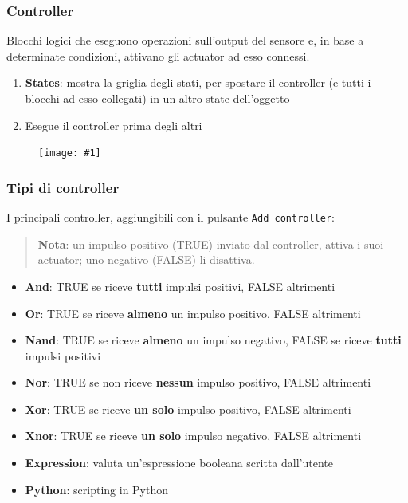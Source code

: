 \documentclass{beamer}
\def\code#1{\texttt{#1}}
\def\image[#1][#2]{
	\begin{figure}[H]
		\centering
		\texttt{[image: \#1]}
\end{figure}}
\begin{document}
		\begin{frame}
			\frametitle{Controller}
			Blocchi logici che \textcolor{BlenderOrange}{eseguono operazioni} sull'output del sensore e, in base a determinate condizioni, \textcolor{BlenderOrange}{attivano gli actuator} ad esso connessi.
			\begin{enumerate}
				\item \textbf{States}: mostra la griglia degli stati, per spostare il controller (e tutti i blocchi ad esso collegati) in un altro state dell'oggetto
				\item Esegue il controller prima degli altri
			\end{enumerate}
			\image[images/contr.png][scale=0.3]
		\end{frame}	
		\begin{frame}
			\frametitle{Tipi di controller}
			I principali controller, aggiungibili con il pulsante \code{Add controller}:
			\begin{quote}
			\textcolor{BlenderOrange}{\textbf{Nota}: un impulso positivo (TRUE) inviato dal controller, attiva i suoi actuator; uno negativo (FALSE) li disattiva.}
			\end{quote}
			\begin{itemize}
				\item \textbf{And}: {\footnotesize TRUE se riceve \textbf{tutti} impulsi positivi, FALSE altrimenti}
				\item \textbf{Or}: {\footnotesize TRUE se riceve \textbf{almeno} un impulso positivo, FALSE altrimenti}
				\item \textbf{Nand}: {\footnotesize TRUE se riceve \textbf{almeno} un impulso negativo, FALSE se riceve \textbf{tutti} impulsi positivi}
				\item \textbf{Nor}: {\footnotesize TRUE se non riceve \textbf{nessun} impulso positivo, FALSE altrimenti}
				\item \textbf{Xor}: {\footnotesize TRUE se riceve \textbf{un solo} impulso positivo, FALSE altrimenti}
				\item \textbf{Xnor}: {\footnotesize TRUE se riceve \textbf{un solo} impulso negativo, FALSE altrimenti}
				\item \textbf{Expression}: {\footnotesize valuta un'espressione booleana scritta dall'utente}
				\item \textbf{Python}: {\footnotesize scripting in Python}
			\end{itemize}
		\end{frame}
\end{document}
